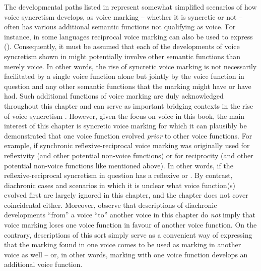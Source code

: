 The developmental paths listed in  represent somewhat simplified scenarios of how voice syncretism develops, as voice marking -- whether it is syncretic or not -- often has various additional semantic functions not qualifying as voice. For instance, in some languages reciprocal voice marking can also be used to express  (). Consequently, it must be assumed that each of the developments of voice syncretism shown in  might potentially involve other semantic functions than merely voice. In other words, the rise of syncretic voice marking is not necessarily facilitated by a single voice function alone but jointly by the voice function in question and any other semantic functions that the marking might have or have had. Such additional functions of voice marking are duly acknowledged throughout this chapter and can serve as important bridging contexts in the rise of voice syncretism \citep{heine:kuteva:2007}. However, given the focus on voice in this book, the main interest of this chapter is syncretic voice marking for which it can plausibly be demonstrated that one voice function evolved \textit{prior} to other voice functions. For example, if synchronic reflexive-reciprocal voice marking was originally used for reflexivity (and other potential non-voice functions) or for reciprocity (and other potential non-voice functions like  mentioned above). In other words, if the reflexive-reciprocal syncretism in question has a reflexive or . By contrast, diachronic cases and scenarios in which it is unclear what voice function(s) evolved first are largely ignored in this chapter, and the chapter does not cover coincidental  either. Moreover, observe that descriptions of diachronic developments “from” a voice “to” another voice in this chapter do \textit{not} imply that voice marking loses one voice function in favour of another voice function. On the contrary, descriptions of this sort simply serve as a convenient way of expressing that the marking found in one voice comes to be used as marking in another voice as well -- or, in other words, marking with one voice function develops an additional voice function. 


